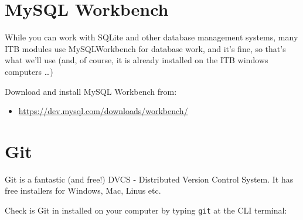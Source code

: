 \documentclass[a4paperpaper,openright]{book}
\providecommand{\tightlist}{%
  \setlength{\itemsep}{0pt}\setlength{\parskip}{0pt}}
\begin{document}
\hypertarget{mysql-workbench}{%
\section{MySQL Workbench}\label{mysql-workbench}}

While you can work with SQLite and other database management systems,
many ITB modules use MySQLWorkbench for database work, and it's fine, so
that's what we'll use (and, of course, it is already installed on the
ITB windows computers \ldots{})

Download and install MySQL Workbench from:

\begin{itemize}
\tightlist
\item
  \url{https://dev.mysql.com/downloads/workbench/}
\end{itemize}

\hypertarget{git}{%
\section{Git}\label{git}}

Git is a fantastic (and free!) DVCS - Distributed Version Control
System. It has free installers for Windows, Mac, Linus etc.

Check is Git in installed on your computer by typing \texttt{git} at the
CLI terminal:
\end{document}
